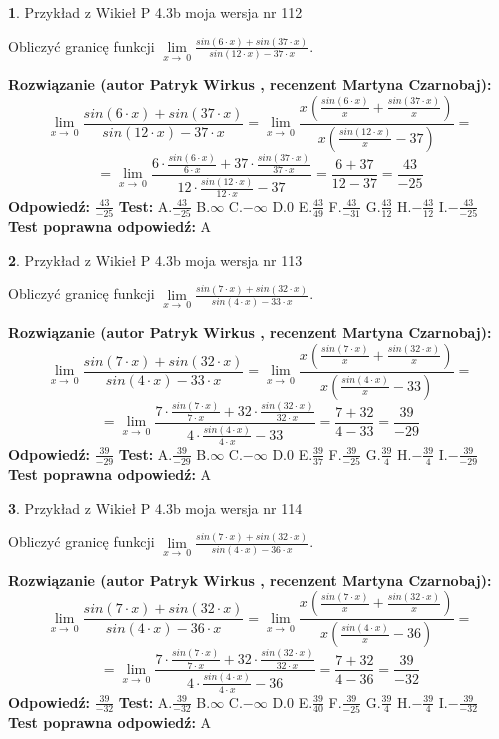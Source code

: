 \documentclass[12pt, a4paper]{article}
\theoremstyle{definition} %
\newtheorem{zad}{}
\newcommand{\zadStart}[1]{\begin{zad}#1\newline}
\newcommand{\zadStop}{\end{zad}}
\newcommand{\rozwStart}[2]{\noindent \textbf{Rozwiązanie (autor #1 , recenzent #2): }\newline}
\newcommand{\rozwStop}{\newline}
\newcommand{\odpStart}{\noindent \textbf{Odpowiedź:}\newline}
\newcommand{\odpStop}{\newline}
\newcommand{\testStart}{\noindent \textbf{Test:}\newline}
\newcommand{\testStop}{\newline}
\newcommand{\kluczStart}{\noindent \textbf{Test poprawna odpowiedź:}\newline}
\newcommand{\kluczStop}{\newline}
\begin{document}
\zadStart{Przykład z Wikieł P 4.3b moja wersja nr 112}


Obliczyć granicę funkcji $\lim\limits_{x\to\ 0}\frac{sin(6 \cdot x)+sin(37 \cdot x)}{sin(12 \cdot x)-37 \cdot x}$.
\zadStop
\rozwStart{Patryk Wirkus}{Martyna Czarnobaj}
$$\lim\limits_{x\to\ 0}\frac{sin(6 \cdot x)+sin(37 \cdot x)}{sin(12 \cdot x)-37 \cdot x}=\lim\limits_{x\to\ 0}\frac{x(\frac{sin(6 \cdot x)}{x}+\frac{sin(37 \cdot x)}{x})}{x(\frac{sin(12 \cdot x)}{x}-37)}=$$
$$=\lim\limits_{x\to\ 0}\frac{6 \cdot \frac{sin(6 \cdot x)}{6 \cdot x}+37 \cdot \frac{sin(37 \cdot x)}{37 \cdot x}}{12 \cdot \frac{sin(12 \cdot x)}{12 \cdot x}-37}=\frac{6+37}{12-37} = \frac{43}{-25}$$
\rozwStop
\odpStart
$\frac{43}{-25}$
\odpStop
\testStart
A.$\frac{43}{-25}$
B.$\infty$
C.$-\infty$
D.$0$
E.$\frac{43}{49}$
F.$\frac{43}{-31}$
G.$\frac{43}{12}$
H.$-\frac{43}{12}$
I.$-\frac{43}{-25}$
\testStop
\kluczStart
A
\kluczStop



\zadStart{Przykład z Wikieł P 4.3b moja wersja nr 113}


Obliczyć granicę funkcji $\lim\limits_{x\to\ 0}\frac{sin(7 \cdot x)+sin(32 \cdot x)}{sin(4 \cdot x)-33 \cdot x}$.
\zadStop
\rozwStart{Patryk Wirkus}{Martyna Czarnobaj}
$$\lim\limits_{x\to\ 0}\frac{sin(7 \cdot x)+sin(32 \cdot x)}{sin(4 \cdot x)-33 \cdot x}=\lim\limits_{x\to\ 0}\frac{x(\frac{sin(7 \cdot x)}{x}+\frac{sin(32 \cdot x)}{x})}{x(\frac{sin(4 \cdot x)}{x}-33)}=$$
$$=\lim\limits_{x\to\ 0}\frac{7 \cdot \frac{sin(7 \cdot x)}{7 \cdot x}+32 \cdot \frac{sin(32 \cdot x)}{32 \cdot x}}{4 \cdot \frac{sin(4 \cdot x)}{4 \cdot x}-33}=\frac{7+32}{4-33} = \frac{39}{-29}$$
\rozwStop
\odpStart
$\frac{39}{-29}$
\odpStop
\testStart
A.$\frac{39}{-29}$
B.$\infty$
C.$-\infty$
D.$0$
E.$\frac{39}{37}$
F.$\frac{39}{-25}$
G.$\frac{39}{4}$
H.$-\frac{39}{4}$
I.$-\frac{39}{-29}$
\testStop
\kluczStart
A
\kluczStop



\zadStart{Przykład z Wikieł P 4.3b moja wersja nr 114}


Obliczyć granicę funkcji $\lim\limits_{x\to\ 0}\frac{sin(7 \cdot x)+sin(32 \cdot x)}{sin(4 \cdot x)-36 \cdot x}$.
\zadStop
\rozwStart{Patryk Wirkus}{Martyna Czarnobaj}
$$\lim\limits_{x\to\ 0}\frac{sin(7 \cdot x)+sin(32 \cdot x)}{sin(4 \cdot x)-36 \cdot x}=\lim\limits_{x\to\ 0}\frac{x(\frac{sin(7 \cdot x)}{x}+\frac{sin(32 \cdot x)}{x})}{x(\frac{sin(4 \cdot x)}{x}-36)}=$$
$$=\lim\limits_{x\to\ 0}\frac{7 \cdot \frac{sin(7 \cdot x)}{7 \cdot x}+32 \cdot \frac{sin(32 \cdot x)}{32 \cdot x}}{4 \cdot \frac{sin(4 \cdot x)}{4 \cdot x}-36}=\frac{7+32}{4-36} = \frac{39}{-32}$$
\rozwStop
\odpStart
$\frac{39}{-32}$
\odpStop
\testStart
A.$\frac{39}{-32}$
B.$\infty$
C.$-\infty$
D.$0$
E.$\frac{39}{40}$
F.$\frac{39}{-25}$
G.$\frac{39}{4}$
H.$-\frac{39}{4}$
I.$-\frac{39}{-32}$
\testStop
\kluczStart
A
\kluczStop
\end{document}
